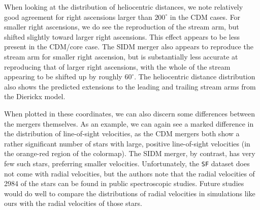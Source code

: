 When looking at the distribution of heliocentric distances, we note relatively
good agreement for right ascensions larger than $200^\circ$ in the CDM cases.
For smaller right ascensions, we do see the reproduction of the stream arm, but
shifted slightly toward larger right ascensions. This effect appears to be
less present in the CDM/core case. The SIDM merger also appears to reproduce the
stream arm for smaller right ascension, but is substantially less accurate at
reproducing that of larger right ascensions, with the whole of the stream
appearing to be shifted up by roughly $60^\circ$. The heliocentric distance
distribution also shows the predicted extensions to the leading and trailing
stream arms from the Dierickx model. 

When plotted in these coordinates, we can also discern some differences between
the mergers themselves. As an example, we can again see a marked difference in
the distribution of line-of-sight velocities, as the CDM mergers both show a
rather significant number of stars with large, positive line-of-sight
velocities (in the orange-red region of the colormap). The SIDM merger, by
contrast, has very few such stars, preferring smaller velocities. Unfortunately,
the \verb|SF| dataset does not come with radial velocities, but the authors note
that the radial velocities of 2984 of the stars can be found in public
spectroscopic studies. Future studies would do well to compare the distributions
of radial velocities in simulations like ours with the radial velocities of
those stars.



